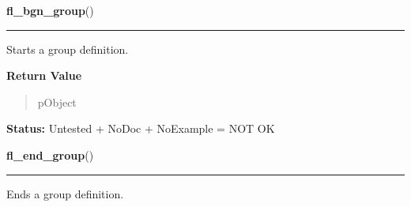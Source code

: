 \hspace{.8\funcindent}\begin{boxedminipage}{\funcwidth}

    \raggedright \textbf{fl\_bgn\_group}()

    \vspace{-1.5ex}

    \rule{\textwidth}{0.5\fboxrule}
\setlength{\parskip}{2ex}
    Starts a group definition.

\setlength{\parskip}{1ex}
      \textbf{Return Value}
    \vspace{-1ex}

      \begin{quote}
      pObject

      \end{quote}

\textbf{Status:} Untested + NoDoc + NoExample = NOT OK



    \end{boxedminipage}

    \label{xformslib:library:fl_end_group}

    \vspace{0.5ex}

\hspace{.8\funcindent}\begin{boxedminipage}{\funcwidth}

    \raggedright \textbf{fl\_end\_group}()

    \vspace{-1.5ex}

    \rule{\textwidth}{0.5\fboxrule}
\setlength{\parskip}{2ex}
    Ends a group definition.

\setlength{\parskip}{1ex}
    \end{boxedminipage}

    \label{xformslib:library:fl_addto_group}

    \vspace{0.5ex}

